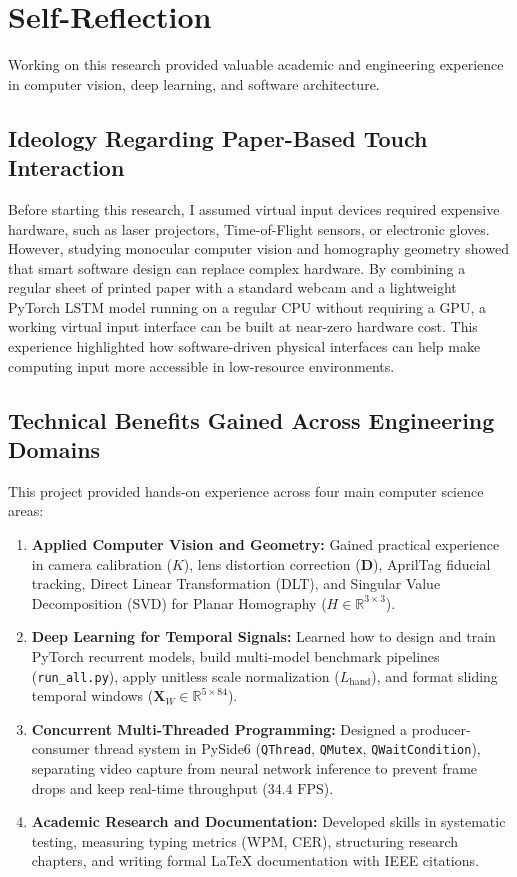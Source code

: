 \section{Self-Reflection}
\label{sec:concl_reflection}
Working on this research provided valuable academic and engineering experience in computer vision, deep learning, and software architecture.

\subsection{Ideology Regarding Paper-Based Touch Interaction}
Before starting this research, I assumed virtual input devices required expensive hardware, such as laser projectors, Time-of-Flight sensors, or electronic gloves. However, studying monocular computer vision and homography geometry showed that smart software design can replace complex hardware. By combining a regular sheet of printed paper with a standard webcam and a lightweight PyTorch LSTM model running on a regular CPU without requiring a GPU, a working virtual input interface can be built at near-zero hardware cost. This experience highlighted how software-driven physical interfaces can help make computing input more accessible in low-resource environments.

\subsection{Technical Benefits Gained Across Engineering Domains}
This project provided hands-on experience across four main computer science areas:
\begin{enumerate}
    \item \textbf{Applied Computer Vision and Geometry:} Gained practical experience in camera calibration ($K$), lens distortion correction ($\mathbf{D}$), AprilTag fiducial tracking, Direct Linear Transformation (DLT), and Singular Value Decomposition (SVD) for Planar Homography ($H \in \mathbb{R}^{3 \times 3}$).
    \item \textbf{Deep Learning for Temporal Signals:} Learned how to design and train PyTorch recurrent models, build multi-model benchmark pipelines (\texttt{run\_all.py}), apply unitless scale normalization ($L_{\text{hand}}$), and format sliding temporal windows ($\mathbf{X}_W \in \mathbb{R}^{5 \times 84}$).
    \item \textbf{Concurrent Multi-Threaded Programming:} Designed a producer-consumer thread system in PySide6 (\texttt{QThread}, \texttt{QMutex}, \texttt{QWaitCondition}), separating video capture from neural network inference to prevent frame drops and keep real-time throughput ($34.4\text{ FPS}$).
    \item \textbf{Academic Research and Documentation:} Developed skills in systematic testing, measuring typing metrics (WPM, CER), structuring research chapters, and writing formal LaTeX documentation with IEEE citations.
\end{enumerate}

